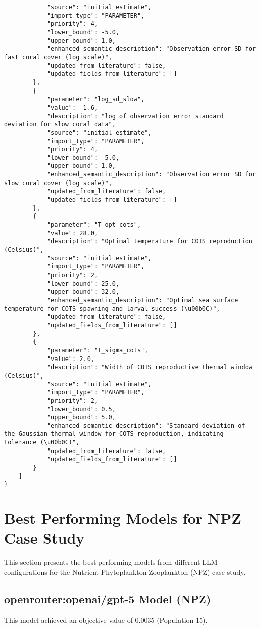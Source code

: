 \begin{lstlisting}
            "source": "initial estimate",
            "import_type": "PARAMETER",
            "priority": 4,
            "lower_bound": -5.0,
            "upper_bound": 1.0,
            "enhanced_semantic_description": "Observation error SD for fast coral cover (log scale)",
            "updated_from_literature": false,
            "updated_fields_from_literature": []
        },
        {
            "parameter": "log_sd_slow",
            "value": -1.6,
            "description": "log of observation error standard deviation for slow coral data",
            "source": "initial estimate",
            "import_type": "PARAMETER",
            "priority": 4,
            "lower_bound": -5.0,
            "upper_bound": 1.0,
            "enhanced_semantic_description": "Observation error SD for slow coral cover (log scale)",
            "updated_from_literature": false,
            "updated_fields_from_literature": []
        },
        {
            "parameter": "T_opt_cots",
            "value": 28.0,
            "description": "Optimal temperature for COTS reproduction (Celsius)",
            "source": "initial estimate",
            "import_type": "PARAMETER",
            "priority": 2,
            "lower_bound": 25.0,
            "upper_bound": 32.0,
            "enhanced_semantic_description": "Optimal sea surface temperature for COTS spawning and larval success (\u00b0C)",
            "updated_from_literature": false,
            "updated_fields_from_literature": []
        },
        {
            "parameter": "T_sigma_cots",
            "value": 2.0,
            "description": "Width of COTS reproductive thermal window (Celsius)",
            "source": "initial estimate",
            "import_type": "PARAMETER",
            "priority": 2,
            "lower_bound": 0.5,
            "upper_bound": 5.0,
            "enhanced_semantic_description": "Standard deviation of the Gaussian thermal window for COTS reproduction, indicating tolerance (\u00b0C)",
            "updated_from_literature": false,
            "updated_fields_from_literature": []
        }
    ]
}
\end{lstlisting}
\clearpage
\section{Best Performing Models for NPZ Case Study}
\label{sec:best_models_npz}
This section presents the best performing models from different LLM configurations for the Nutrient-Phytoplankton-Zooplankton (NPZ) case study.

\subsection{openrouter:openai/gpt-5 Model (NPZ)}
This model achieved an objective value of 0.0035 (Population 15).

